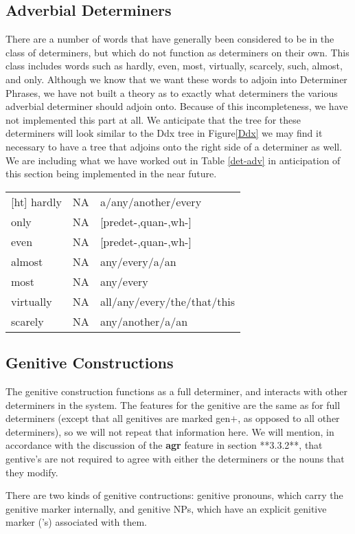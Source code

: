 \subsection{Adverbial Determiners}

There are a number of words that have generally been considered to be in the
class of determiners, but which do not function as determiners on their own.
This class includes words such as hardly, even, most, virtually, scarcely,
such, almost, and only.  Although we know that we want these words to adjoin
into Determiner Phrases, we have not built a theory as to exactly what
determiners the various adverbial determiner should adjoin onto.  Because of
this incompleteness, we have not implemented this part at all.  We anticipate
that the tree for these determiners will look similar to the Ddx tree in Figure\ref{Ddx}  we may find it necessary to have a tree that adjoins onto the
right side of a determiner as well.  We are including what we have worked out in Table \ref{det-adv}
in anticipation of this section being implemented in the near future.

\begin{tabular}{lll}[ht]
hardly&NA&a/any/another/every\\
only&NA&[predet-,quan-,wh-]\\
even&NA&[predet-,quan-,wh-]\\
almost&NA&any/every/a/an\\
most&NA&any/every\\
virtually&NA&all/any/every/the/that/this\\
scarely&NA&any/another/a/an\\
\end{tabular}


\subsection{Genitive Constructions}

The genitive construction functions as a full determiner, and interacts with
other determiners in the system.  The features for the genitive are the same as
for full determiners (except that all genitives are marked gen$+$, as opposed to
all other determiners), so we will not repeat that information here.  We will
mention, in accordance with the discussion of the {\bf agr} feature in section
**3.3.2**, that gentive's are not required to agree with either the
determiners or the nouns that they modify.  

There are two kinds of genitive contructions: genitive pronouns, which carry
the genitive marker internally, and genitive NPs, which have an explicit
genitive marker ('s) associated with them.

